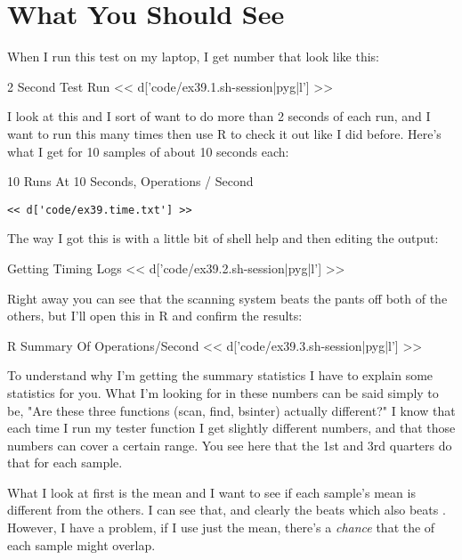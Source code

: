 \section{What You Should See}

When I run this test on my laptop, I get number that look like this:

\begin{code}{2 Second Test Run}
<< d['code/ex39.1.sh-session|pyg|l'] >>
\end{code}

I look at this and I sort of want to do more than 2 seconds of each run, and I
want to run this many times then use R to check it out like I did before.
Here's what I get for 10 samples of about 10 seconds each:

\begin{code}{10 Runs At 10 Seconds, Operations / Second}
\begin{Verbatim}
<< d['code/ex39.time.txt'] >>
\end{Verbatim}
\end{code}

The way I got this is with a little bit of shell help and then editing the
output:

\begin{code}{Getting Timing Logs}
<< d['code/ex39.2.sh-session|pyg|l'] >>
\end{code}

Right away you can see that the scanning system beats the pants off both of the
others, but I'll open this in R and confirm the results:

\begin{code}{R Summary Of Operations/Second}
<< d['code/ex39.3.sh-session|pyg|l'] >>
\end{code}

To understand why I'm getting the summary statistics I have to explain some
statistics for you.  What I'm looking for in these numbers can be said simply
to be, "Are these three functions (scan, find, bsinter) actually different?"  I
know that each time I run my tester function I get slightly different numbers,
and that those numbers can cover a certain range.  You see here that the
1st and 3rd quarters do that for each sample.

What I look at first is the mean and I want to see if each sample's mean is
different from the others.  I can see that, and clearly the  beats
 which also beats .  However, I have a problem, if I
use just the mean, there's a \emph{chance} that the  of each
sample might overlap.

